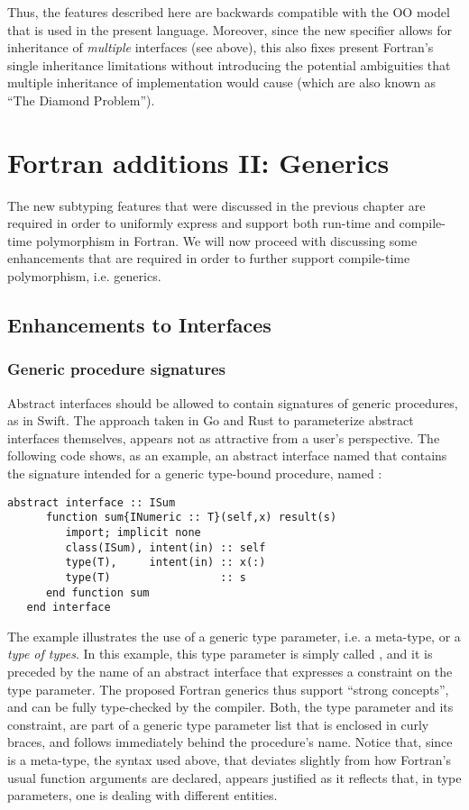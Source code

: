\documentclass[11pt,oneside]{report}
\newcommand{\code}[1]{{\selectfont\ttfamily{#1}}}
\begin{document}
Thus, the features described here are backwards compatible with the OO
model that is used in the present language. Moreover, since the new
\code{implements} specifier allows for inheritance of \emph{multiple}
interfaces (see above), this also fixes present Fortran's single
inheritance limitations without introducing the potential ambiguities
that multiple inheritance of implementation would cause (which are
also known as ``The Diamond Problem'').


\chapter{Fortran additions II: Generics}

The new subtyping features that were discussed in the previous chapter
are required in order to uniformly express and support both run-time
and compile-time polymorphism in Fortran. We will now proceed with
discussing some enhancements that are required in order to further
support compile-time polymorphism, i.e. generics.

\section{Enhancements to Interfaces}

\subsection{Generic procedure signatures} 
\label{sect:generic_interfaces}

Abstract interfaces should be allowed to contain signatures of generic
procedures, as in Swift. The approach taken in Go and Rust to
parameterize abstract interfaces themselves, appears not as attractive
from a user's perspective. The following code shows, as an example, an
abstract interface named \code{ISum} that contains the signature
intended for a generic type-bound procedure, named \code{sum}:
\begin{lstlisting}[language=LFortran,style=boxed]
   abstract interface :: ISum
      function sum{INumeric :: T}(self,x) result(s)
         import; implicit none
         class(ISum), intent(in) :: self
         type(T),     intent(in) :: x(:)
         type(T)                 :: s
      end function sum
   end interface
\end{lstlisting}

The example illustrates the use of a generic type parameter, i.e.  a
meta-type, or a \emph{type of types}. In this example, this type
parameter is simply called \code{T}, and it is preceded by the name of
an abstract interface that expresses a constraint on the type
parameter. The proposed Fortran generics thus support ``strong
concepts'', and can be fully type-checked by the compiler. Both, the
type parameter and its constraint, are part of a generic type
parameter list that is enclosed in curly braces, and follows
immediately behind the procedure's name. Notice that, since \code{T}
is a meta-type, the syntax used above, that deviates slightly from how
Fortran's usual function arguments are declared, appears justified as
it reflects that, in type parameters, one is dealing with different
entities.
\end{document}
